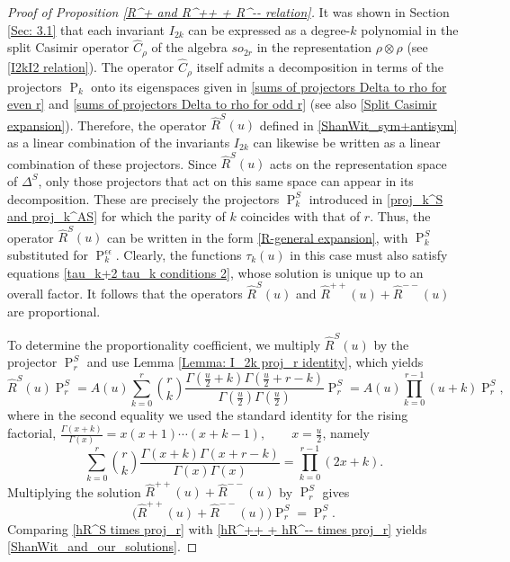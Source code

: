 \documentclass[a4paper]{article}
\newcommand{\hC}{\widehat{C}}
\newcommand{\hR}{\hat{R}}
\renewcommand{\=}{\ =\ }
\DeclareMathOperator{\proj}{P}
\numberwithin{equation}{section}
\theoremstyle{remark}
\begin{document}
\begin{proof}[Proof of Proposition \ref{R^+ and R^++ + R^-- relation}]
It was shown in Section \ref{Sec: 3.1} that each invariant $I_{2k}$ can be expressed as a degree-$k$ polynomial in the split Casimir operator $\hC_\rho$ of the algebra $so_{2r}$ in the representation $\rho\otimes \rho$ (see \eqref{I2kI2 relation}). The operator $\hC_\rho$ itself admits a decomposition in terms of the projectors $\proj_k$ onto its eigenspaces given in \eqref{sums of projectors Delta to rho for even r} and \eqref{sums of projectors Delta to rho for odd r} (see also \eqref{Split Casimir expansion}). Therefore, the operator $\hR^S(u)$ defined in \eqref{ShanWit_sym+antisym} as a linear combination of the invariants $I_{2k}$ can likewise be written as a linear combination of these projectors. Since $\hR^S(u)$ acts on the representation space of $\Delta^S$, only those projectors that act on this same space can appear in its decomposition. These are precisely the projectors $\proj_k^S$ introduced in \eqref{proj_k^S and proj_k^AS} for which the parity of $k$ coincides with that of $r$. Thus, the operator $\hR^S(u)$ can be written in the form \eqref{R-general expansion}, with $\proj_k^S$ substituted for $\proj_k^{\epsilon\epsilon}$. Clearly, the functions $\tau_k(u)$ in this case must also satisfy equations \eqref{tau_k+2 tau_k conditions 2}, whose solution is unique up to an overall factor.
It follows that the operators $\hR^S(u)$ and $\hR^{++}(u)+\hR^{--}(u)$ are proportional.

To determine the proportionality coefficient, we multiply $\hR^S(u)$ by the projector $\proj_r^S$ and use Lemma \ref{Lemma: I_2k proj_r identity}, which yields
\begin{equation}\label{hR^S times proj_r}
\hR^S(u)\proj_r^S = A(u) \sum_{k=0}^r \binom{r}{k} \frac{\Gamma(\frac{u}{2}+k)\Gamma(\frac{u}{2}+r-k)} {\Gamma(\frac{u}{2})\Gamma(\frac{u}{2})} \proj_r^S = A(u) \prod_{k=0}^{r-1}(u+k) \proj_r^S,
\end{equation}
where in the second equality we used the standard identity for the rising factorial, $\frac{\Gamma(x+k)}{\Gamma(x)}=x(x+1)\cdots(x+k-1), \qquad x=\frac{u}{2}$, namely
\begin{equation}
\sum_{k=0}^r \binom{r}{k} \frac{\Gamma(x+k)\Gamma(x+r-k)} {\Gamma(x)\Gamma(x)} = \prod_{k=0}^{r-1}(2x+k).
\end{equation}
Multiplying the solution $\hR^{++}(u)+\hR^{--}(u)$ by $\proj_r^S$ gives
\begin{equation}\label{hR^++ + hR^-- times proj_r}
\bigl(\hR^{++}(u)+\hR^{--}(u)\bigr)\proj_r^S = \proj_r^S.
\end{equation}
Comparing \eqref{hR^S times proj_r} with \eqref{hR^++ + hR^-- times proj_r} yields \eqref{ShanWit_and_our_solutions}.
\end{proof}
\end{document}
